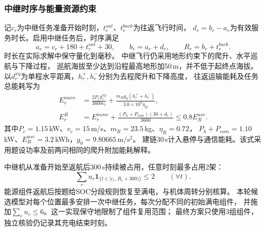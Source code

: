 \subsubsection{中继时序与能量资源约束}
记$c_r$为中继任务准备开始时刻，$t_r^{out}$、$t_r^{back}$为往返飞行时间，
$d_r=b_r-a_r$为有效服务时长。启用中继任务后，时序满足
\begin{equation}
 a_r=c_r+180+t_r^{out}+30,\qquad
 b_r=a_r+d_r,\qquad R_r=b_r+t_r^{back}.
 \label{eq:q3-relaytime}
\end{equation}
时长在实际求解中保守量化到毫秒。
中继飞行仍采用地形约束下的爬升、水平巡航与下降过程，
巡航海拔至少达到沿程最高地形加50\,m，并不低于起终点海拔。
以$d_r^{xy}$为单程水平距离，$h_r^+,h_r^-$分别为去程爬升和下降高度，
往返运输能耗及任务总能耗写为
\begin{align}
 E_r^{move}&=\frac{2P_c d_r^{xy}}{3600v_c}
   +\frac{m_Rg_0(h_r^++h_r^-)}{3.6\times10^6\eta_R},\label{eq:q3-relaymove}\\
 E_r^R&=E_r^{move}+\frac{(P_h+P_{com})(30+d_r)}{3600}
       \le0.8E_R^{use}.\label{eq:q3-relayenergy}
\end{align}
其中$P_c=1.15$\,kW、$v_c=15$\,m/s、$m_R=23.5$\,kg、$\eta_R=0.72$，
$P_h+P_{com}=1.10$\,kW、$E_R^{use}=3.2$\,kWh，$g_0=9.80665\,\mathrm{m/s^2}$。
建链30\,s计入悬停与通信能耗。该式采用题设功率及前两问相同的爬升附加能耗解释。

中继机从准备开始至返航后300\,s持续被占用，任意时刻最多占用2架：
\begin{equation}
 \sum_r u_r\mathbf1_{\{t\in[c_r,R_r+300)\}}\le2\qquad(\forall t).
 \label{eq:q3-relayresource}
\end{equation}
能源组件返航后按题给SOC分段规则恢复至满电，与机体周转分别核算。
本轮候选模型对每个位置最多安排一次中继任务，每次分配不同的初始满电组件，
并施加$\sum_r u_r\le6$。这一实现保守地限制了组件复用范围；
最终方案只使用3组组件，独立核验仍记录其充电结束时刻。

